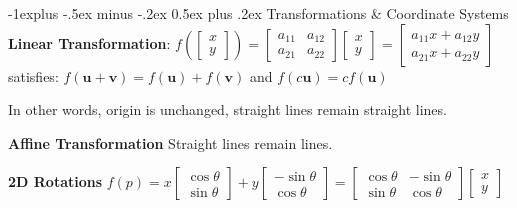 \documentclass[letterpaper, 8pt]{extarticle}
\makeatletter
\renewcommand{\section}{\@startsection{section}{1}{0mm}%
                                {-1explus -.5ex minus -.2ex}%
                                {0.5ex plus .2ex}%
                                {\normalfont\small\bfseries}}
\makeatother
\begin{document}
\begin{multicols*}{4}



\section{Transformations \& Coordinate Systems}
\textbf{Linear Transformation}:
\(
f(\begin{bmatrix}
    x \\ y
\end{bmatrix})
= \begin{bmatrix}
    a_{11} & a_{12} \\
    a_{21} & a_{22}
\end{bmatrix}
\begin{bmatrix}
    x \\ y
\end{bmatrix}
=
\begin{bmatrix}
    a_{11} x + a_{12} y \\
    a_{21} x + a_{22} y
\end{bmatrix}
\)
satisfies: \(
f(\mathbf{u} + \mathbf{v})
= f(\mathbf{u}) + f(\mathbf{v})
\)
and
\(
f(c\mathbf{u}) = cf(\mathbf{u})
\)

In other words, origin is unchanged, straight lines remain straight lines.

\textbf{Affine Transformation}
Straight lines remain lines.

\textbf{2D Rotations}
\(
f(p)
= x \begin{bmatrix}
    \cos \theta \\ \sin \theta
\end{bmatrix}
+ y \begin{bmatrix}
    -\sin \theta \\ \cos \theta
\end{bmatrix}
= \begin{bmatrix}
    \cos \theta & - \sin \theta \\
    \sin \theta & \cos \theta
\end{bmatrix}
\begin{bmatrix}
    x \\ y
\end{bmatrix}
\)


\end{multicols*}
\end{document}

